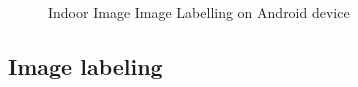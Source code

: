 \documentclass[11pt]{ucscthesis}
\begin{document}
\begin{figure}
  \hfill  
  \hfill
\caption{Indoor Image Image Labelling on Android device}
\end{figure}
\subsection{Image labeling}
\end{document}
